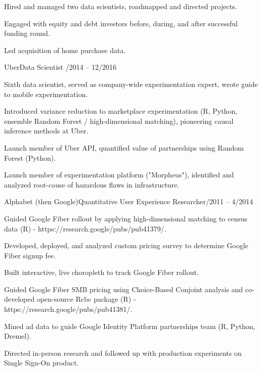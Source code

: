 \documentclass[12pt]{res}
\begin{document}
{\begin{resume}
\begin{list}{}{\leftmargin=1em}
{\begin{list}{}{\leftmargin=1em}
\begin{list}{-}{\leftmargin=1em}
\item Hired and managed two data scientists, roadmapped and directed projects.
\item Engaged with equity and debt investors before, during, and after successful funding round.
\item Led acquisition of home purchase data.
\end{list}
\item Uber\dotfill Data Scientist /2014 -- 12/2016
\begin{list}{-}{\leftmargin=1em}
\item Sixth data scientist, served as company-wide experimentation expert, wrote guide to mobile experimentation.
\item Introduced variance reduction to marketplace experimentation (R, Python, ensemble Random Forest / high-dimensional matching), pioneering causal inference methods at Uber.
\item Launch member of Uber API, quantified value of partnerships using Random Forest (Python).
\item Launch member of experimentation platform ("Morpheus"), identified and analyzed root-cause of hazardous flaws in infrastructure.
\end{list}
\item Alphabet (then Google)\dotfill Quantitative User Experience Researcher/2011 -- 4/2014
\begin{list}{-}{\leftmargin=1em}
\item Guided Google Fiber rollout by applying high-dimensional matching to census data (R) - https://research.google/pubs/pub41379/.
\item Developed, deployed, and analyzed custom pricing survey to determine Google Fiber signup fee.
\item Built interactive, live choropleth to track Google Fiber rollout.
\item Guided Google Fiber SMB pricing using Choice-Based Conjoint analysis and co-developed open-source Rcbc package (R) - https://research.google/pubs/pub41381/.
\item Mined ad data to guide Google Identity Platform partnerships team (R, Python, Dremel).
\item Directed in-person research and followed up with production experiments on Single Sign-On product.
\end{list}
\end{list}}
\item
\end{list}
\end{resume}
} %
\end{document}
